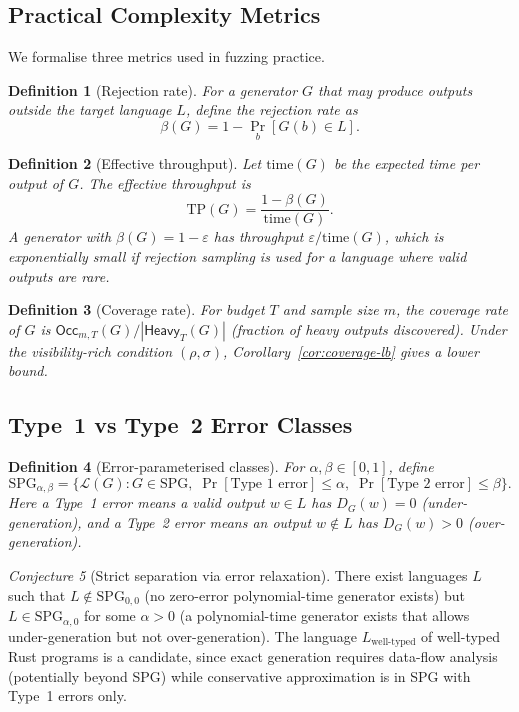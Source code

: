 \documentclass[11pt]{article}
\newcommand{\SPG}{\text{SPG}}
\newtheorem{definition}{Definition}[section]
\theoremstyle{remark}
\newtheorem{conjecture}[definition]{Conjecture}
\theoremstyle{definition}
\begin{document}
\subsection{Practical Complexity Metrics}\label{sec:practical-metrics}

We formalise three metrics used in fuzzing practice.

\begin{definition}[Rejection rate]
For a generator $G$ that may produce outputs outside the target language $L$,
define the rejection rate as
\[
\beta(G) = 1 - \Pr_{b}[G(b) \in L].
\]
\end{definition}

\begin{definition}[Effective throughput]
Let $\mathrm{time}(G)$ be the expected time per output of $G$.  The effective
throughput is
\[
\mathrm{TP}(G) = \frac{1 - \beta(G)}{\mathrm{time}(G)}.
\]
A generator with $\beta(G) = 1 - \varepsilon$ has throughput
$\varepsilon / \mathrm{time}(G)$, which is exponentially small if rejection
sampling is used for a language where valid outputs are rare.
\end{definition}

\begin{definition}[Coverage rate]
For budget $T$ and sample size $m$, the coverage rate of $G$ is
$\mathsf{Occ}_{m,T}(G) / |\mathsf{Heavy}_T(G)|$ (fraction of heavy outputs
discovered).  Under the visibility-rich condition
$(\rho, \sigma)$, Corollary~\ref{cor:coverage-lb} gives a lower bound.
\end{definition}

\subsection{Type~1 vs Type~2 Error Classes}\label{sec:type1-type2-formal}

\begin{definition}[Error-parameterised classes]
For $\alpha, \beta \in [0,1]$, define
\[
\SPG_{\alpha,\beta} = \{ \mathcal{L}(G) : G \in \SPG{},\;
\Pr[\text{Type~1 error}] \le \alpha,\;
\Pr[\text{Type~2 error}] \le \beta \}.
\]
Here a Type~1 error means a valid output $w \in L$ has
$D_G(w) = 0$ (under-generation), and a Type~2 error means an output
$w \notin L$ has $D_G(w) > 0$ (over-generation).
\end{definition}

\begin{conjecture}[Strict separation via error relaxation]
There exist languages $L$ such that $L \notin \SPG_{0,0}$ (no zero-error
polynomial-time generator exists) but $L \in \SPG_{\alpha,0}$ for some
$\alpha > 0$ (a polynomial-time generator exists that allows under-generation
but not over-generation).  The language $L_{\text{well-typed}}$ of
well-typed Rust programs is a candidate, since exact generation requires
data-flow analysis (potentially beyond SPG) while conservative approximation
is in SPG with Type~1 errors only.
\end{conjecture}
\end{document}
